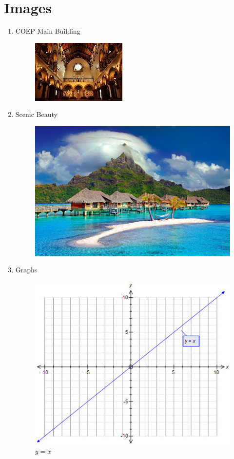 \documentclass[12pt , a4paper]{article}
\begin{document}
\tableofcontents

\pagebreak
\section{Images}

	\begin{enumerate}
	\item COEP Main Building
	\begin{figure}[H]
	\centering
	\includegraphics[width =3 in ]{coep}
	
	\vspace{1in}
	\end{figure}
    \item Scenic Beauty
	

	\begin{figure}[H]
	\centering
	\includegraphics[width =3 in]{image-2}
	
	
	\end{figure}
	
	\item Graphs
	
	\begin{figure}[H]
	\centering
	\includegraphics[width = 3 in]{y=xgraph_new}
	\caption{$ y=x$}
	\end{figure}
	\end{enumerate}
\end{document}
